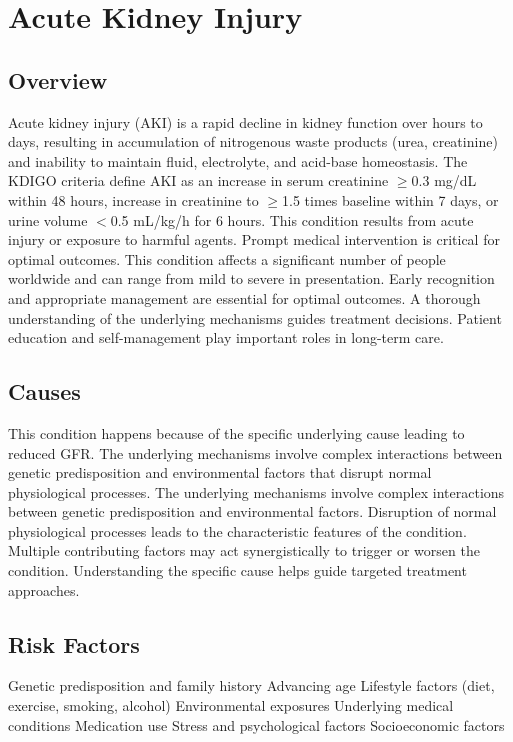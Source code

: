 \chapter{Acute Kidney Injury}
\label{sec:Acute Kidney Injury}

\section{Overview}
Acute kidney injury (AKI) is a rapid decline in kidney function over hours to days, resulting in accumulation of nitrogenous waste products (urea, creatinine) and inability to maintain fluid, electrolyte, and acid-base homeostasis. The KDIGO criteria define AKI as an increase in serum creatinine $\geq$0.3 mg/dL within 48 hours, increase in creatinine to $\geq$1.5 times baseline within 7 days, or urine volume $<$0.5 mL/kg/h for 6 hours. This condition results from acute injury or exposure to harmful agents. Prompt medical intervention is critical for optimal outcomes. This condition affects a significant number of people worldwide and can range from mild to severe in presentation. Early recognition and appropriate management are essential for optimal outcomes. A thorough understanding of the underlying mechanisms guides treatment decisions. Patient education and self-management play important roles in long-term care.
\section{Causes}
This condition happens because of the specific underlying cause leading to reduced GFR. The underlying mechanisms involve complex interactions between genetic predisposition and environmental factors that disrupt normal physiological processes. The underlying mechanisms involve complex interactions between genetic predisposition and environmental factors. Disruption of normal physiological processes leads to the characteristic features of the condition. Multiple contributing factors may act synergistically to trigger or worsen the condition. Understanding the specific cause helps guide targeted treatment approaches.
\section{Risk Factors}
Genetic predisposition and family history Advancing age Lifestyle factors (diet, exercise, smoking, alcohol) Environmental exposures Underlying medical conditions Medication use Stress and psychological factors Socioeconomic factors

